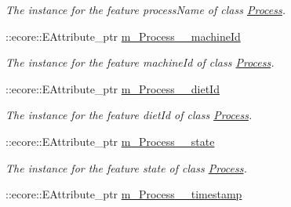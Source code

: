 \begin{DoxyCompactItemize}
\begin{DoxyCompactList}\small\item\em The instance for the feature processName of class \hyperlink{classIMS__Data_1_1Process}{Process}. \item\end{DoxyCompactList}\item 
\hypertarget{classIMS__Data_1_1IMS__DataPackage_a3c65a291d42a30388b94a2781433b698}{
::ecore::EAttribute\_\-ptr \hyperlink{classIMS__Data_1_1IMS__DataPackage_a3c65a291d42a30388b94a2781433b698}{m\_\-Process\_\-\_\-machineId}}
\label{classIMS__Data_1_1IMS__DataPackage_a3c65a291d42a30388b94a2781433b698}

\begin{DoxyCompactList}\small\item\em The instance for the feature machineId of class \hyperlink{classIMS__Data_1_1Process}{Process}. \item\end{DoxyCompactList}\item 
\hypertarget{classIMS__Data_1_1IMS__DataPackage_a6b32e982297a4b75cb47972908042b34}{
::ecore::EAttribute\_\-ptr \hyperlink{classIMS__Data_1_1IMS__DataPackage_a6b32e982297a4b75cb47972908042b34}{m\_\-Process\_\-\_\-dietId}}
\label{classIMS__Data_1_1IMS__DataPackage_a6b32e982297a4b75cb47972908042b34}

\begin{DoxyCompactList}\small\item\em The instance for the feature dietId of class \hyperlink{classIMS__Data_1_1Process}{Process}. \item\end{DoxyCompactList}\item 
\hypertarget{classIMS__Data_1_1IMS__DataPackage_a4a71742300bf59d98bdb68d7f6ba66e9}{
::ecore::EAttribute\_\-ptr \hyperlink{classIMS__Data_1_1IMS__DataPackage_a4a71742300bf59d98bdb68d7f6ba66e9}{m\_\-Process\_\-\_\-state}}
\label{classIMS__Data_1_1IMS__DataPackage_a4a71742300bf59d98bdb68d7f6ba66e9}

\begin{DoxyCompactList}\small\item\em The instance for the feature state of class \hyperlink{classIMS__Data_1_1Process}{Process}. \item\end{DoxyCompactList}\item 
\hypertarget{classIMS__Data_1_1IMS__DataPackage_aee56999f7590cc784cceac4130068ec9}{
::ecore::EAttribute\_\-ptr \hyperlink{classIMS__Data_1_1IMS__DataPackage_aee56999f7590cc784cceac4130068ec9}{m\_\-Process\_\-\_\-timestamp}}
\label{classIMS__Data_1_1IMS__DataPackage_aee56999f7590cc784cceac4130068ec9}


\end{DoxyCompactItemize}
